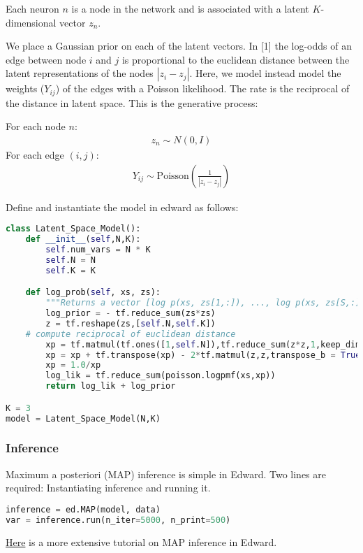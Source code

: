 Each neuron $n$ is a node in the network and is associated with a latent $K$-dimensional vector $z_n$.

We place a Gaussian prior on each of the latent vectors.
In [1] the log-odds of an edge between node $i$ and $j$ is proportional to the euclidean distance between the latent representations of the nodes $|z_i- z_j|$. Here, we model instead model the weights ($Y_{ij}$) of the edges with a Poisson likelihood. The rate is the reciprocal of the distance in latent space. This is the generative process:

For each node $n$:
\begin{align}
z_n \sim N(0,I)
\end{align}
For each edge $(i,j)$:
\begin{align}
Y_{ij} \sim \text{Poisson}(\frac{1}{|z_i - z_j|})
\end{align}

Define and instantiate the model in edward as follows:
\begin{lstlisting}[language=Python]
class Latent_Space_Model():
    def __init__(self,N,K):
        self.num_vars = N * K
        self.N = N
        self.K = K

    def log_prob(self, xs, zs):
        """Returns a vector [log p(xs, zs[1,:]), ..., log p(xs, zs[S,:])]."""
        log_prior = - tf.reduce_sum(zs*zs)
        z = tf.reshape(zs,[self.N,self.K])
	# compute reciprocal of euclidean distance
        xp = tf.matmul(tf.ones([1,self.N]),tf.reduce_sum(z*z,1,keep_dims=True))
        xp = xp + tf.transpose(xp) - 2*tf.matmul(z,z,transpose_b = True)
        xp = 1.0/xp
        log_lik = tf.reduce_sum(poisson.logpmf(xs,xp))
        return log_lik + log_prior

K = 3
model = Latent_Space_Model(N,K)
\end{lstlisting}

\subsubsection{Inference}

Maximum a posteriori (MAP) inference is simple in Edward. Two lines are required: Instantiating inference and running it.
\begin{lstlisting}[language=Python]
inference = ed.MAP(model, data)
var = inference.run(n_iter=5000, n_print=500)
\end{lstlisting}

\href{tut_MAP.html}{Here}
is a more extensive tutorial on MAP inference in Edward.

